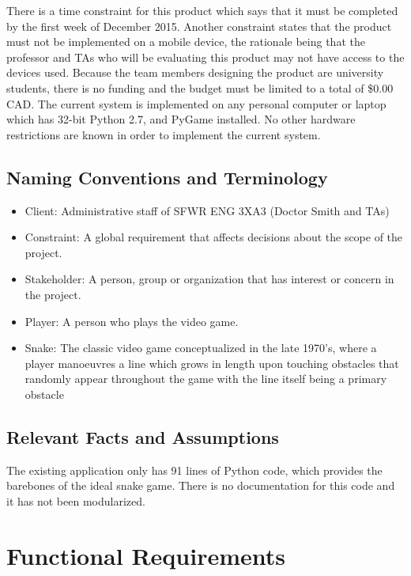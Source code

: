 \documentclass[12pt]{article}
\begin{document}
There is a time constraint for this product which says that it must be completed by the first week of December 2015. Another constraint states that the product must not be implemented on a mobile device, the rationale being that the professor and TAs who will be evaluating this product may not have access to the devices used. Because the team members designing the product are university students, there is no funding and the budget must be limited to a total of \$0.00 CAD. The current system is implemented on any personal computer or laptop which has 32-bit Python 2.7, and PyGame installed. No other hardware restrictions are known in order to implement the current system.

\subsection{Naming Conventions and Terminology}

\begin{itemize}

\item Client: Administrative staff of SFWR ENG 3XA3 (Doctor Smith and TAs)
		 	 	 						
\item Constraint: A global requirement that affects decisions about the scope of the project. 
\item Stakeholder: A person, group or organization that has interest or concern in the project.

\item Player: A person who plays the video game.

\item Snake: The classic video game conceptualized in the late 1970’s, where a player manoeuvres a line which grows in length upon touching obstacles that randomly appear throughout the game with the line itself being a primary obstacle
				
\end{itemize}

\subsection{Relevant Facts and Assumptions}

The existing application only has 91 lines of Python code, which provides the barebones of the ideal snake game. There is no documentation for this code and it has not been modularized.

\section{Functional Requirements}
\end{document}
